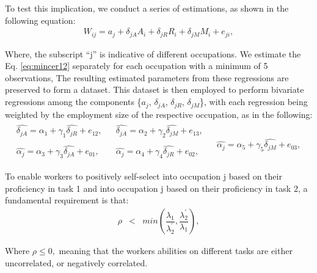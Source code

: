 To test this implication, we conduct a series of estimations, as shown
in the following equation:
\begin{eqnarray}
W_{ij}=a_{j}+\delta_{jA}A_{i}+\delta_{jR}R_{i}+\delta_{jM}M_{i}+e_{ji},\label{eq:mincer12}
\end{eqnarray}

\begin{onehalfspace}
Where, the subscript ``j'' is indicative
of different occupations. We estimate the Eq. \ref{eq:mincer12} separately
for each occupation with a minimum of 5 observations, The resulting
estimated parameters from these regressions are preserved to form
a dataset. This dataset is then employed to perform bivariate regressions
among the components \{$a_{j}$, $\delta_{jA}$, $\delta_{jR}$, $\delta_{jM}$\},
with each regression being weighted by the employment size of the
respective occupation, as in the following: 
\begin{eqnarray}
\begin{array}{c}
\widehat{\delta_{jA}}=\alpha_{1}+\gamma_{1}\widehat{\delta_{jR}}+e_{12},\\
\\
\widehat{\alpha_{j}}=\alpha_{3}+\gamma_{3}\widehat{\delta_{jA}}+e_{01},
\end{array} & \begin{array}{c}
\widehat{\delta_{jA}}=\alpha_{2}+\gamma_{2}\widehat{\delta_{jM}}+e_{13},\\
\\
\widehat{\alpha_{j}}=\alpha_{4}+\gamma_{4}\widehat{\delta_{jR}}+e_{02},
\end{array} & \begin{array}{c}
\\
\\
\widehat{\alpha_{j}}=\alpha_{5}+\gamma_{5}\widehat{\delta_{jM}}+e_{03},
\end{array}\label{eq:bivariate-regressions}
\end{eqnarray}

\end{onehalfspace}

\begin{theorem}

\begin{onehalfspace}
To enable workers to positively self-select into occupation j based
on their proficiency in task 1 and into occupation j \textasciiacute{}
based on their proficiency in task 2, a fundamental requirement is
that:
\begin{eqnarray}
\rho & < & min\left(\dfrac{\lambda_{1}}{\lambda_{2}^{\prime}},\dfrac{\lambda_{2}^{\prime}}{\lambda_{1}}\right),\label{eq:self-selection}
\end{eqnarray}

Where $\rho\leq0,$ meaning that the workers abilities on different
tasks are either uncorrelated, or negatively correlated. 
\end{onehalfspace}

\end{theorem}

